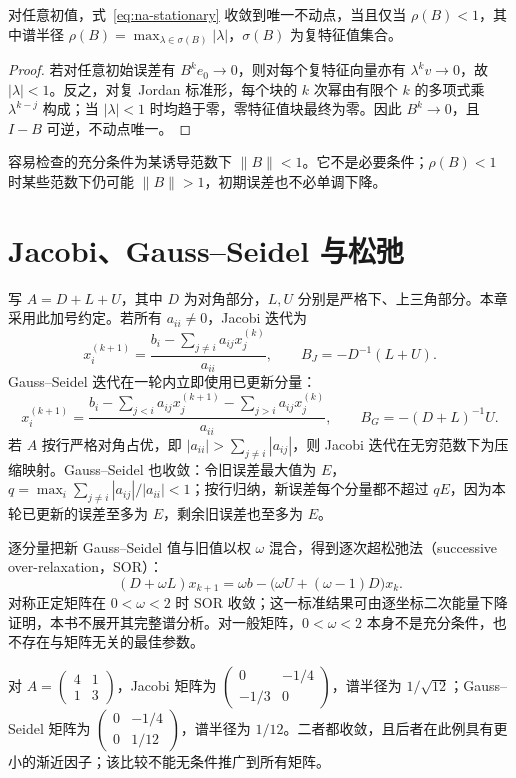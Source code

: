 \documentclass[UTF8,12pt,a4paper,fontset=fandol]{ctexbook}
\begin{document}
\begin{theorem}[定常迭代的充要条件]
对任意初值，式~\eqref{eq:na-stationary} 收敛到唯一不动点，当且仅当 $\rho(B)<1$，其中谱半径 $\rho(B)=\max_{\lambda\in\sigma(B)}|\lambda|$，$\sigma(B)$ 为复特征值集合。
\end{theorem}
\begin{proof}
若对任意初始误差有 $B^ke_0\to0$，则对每个复特征向量亦有 $\lambda^kv\to0$，故 $|\lambda|<1$。反之，对复 Jordan 标准形，每个块的 $k$ 次幂由有限个 $k$ 的多项式乘 $\lambda^{k-j}$ 构成；当 $|\lambda|<1$ 时均趋于零，零特征值块最终为零。因此 $B^k\to0$，且 $I-B$ 可逆，不动点唯一。
\end{proof}

容易检查的充分条件为某诱导范数下 $\|B\|<1$。它不是必要条件；$\rho(B)<1$ 时某些范数下仍可能 $\|B\|>1$，初期误差也不必单调下降。

\section{Jacobi、Gauss--Seidel 与松弛}
写 $A=D+L+U$，其中 $D$ 为对角部分，$L,U$ 分别是严格下、上三角部分。本章采用此加号约定。若所有 $a_{ii}\ne0$，Jacobi 迭代为
\[
 x_i^{(k+1)}=\frac{b_i-\sum_{j\ne i}a_{ij}x_j^{(k)}}{a_{ii}},
 \qquad B_J=-D^{-1}(L+U).
\]
Gauss--Seidel 迭代在一轮内立即使用已更新分量：
\[
 x_i^{(k+1)}=\frac{b_i-\sum_{j<i}a_{ij}x_j^{(k+1)}-\sum_{j>i}a_{ij}x_j^{(k)}}{a_{ii}},
 \qquad B_G=-(D+L)^{-1}U.
\]
若 $A$ 按行严格对角占优，即 $|a_{ii}|>\sum_{j\ne i}|a_{ij}|$，则 Jacobi 迭代在无穷范数下为压缩映射。Gauss--Seidel 也收敛：令旧误差最大值为 $E$，$q=\max_i\sum_{j\ne i}|a_{ij}|/|a_{ii}|<1$；按行归纳，新误差每个分量都不超过 $qE$，因为本轮已更新的误差至多为 $E$，剩余旧误差也至多为 $E$。

逐分量把新 Gauss--Seidel 值与旧值以权 $\omega$ 混合，得到逐次超松弛法（successive over-relaxation，SOR）：
\[
 (D+\omega L)x_{k+1}=\omega b-\bigl(\omega U+(\omega-1)D\bigr)x_k.
\]
对称正定矩阵在 $0<\omega<2$ 时 SOR 收敛；这一标准结果可由逐坐标二次能量下降证明，本书不展开其完整谱分析。对一般矩阵，$0<\omega<2$ 本身不是充分条件，也不存在与矩阵无关的最佳参数。

\begin{example}[一个可直接比较的系统]
对 $A=\begin{pmatrix}4&1\\1&3\end{pmatrix}$，Jacobi 矩阵为 $\begin{pmatrix}0&-1/4\\-1/3&0\end{pmatrix}$，谱半径为 $1/\sqrt{12}$；Gauss--Seidel 矩阵为 $\begin{pmatrix}0&-1/4\\0&1/12\end{pmatrix}$，谱半径为 $1/12$。二者都收敛，且后者在此例具有更小的渐近因子；该比较不能无条件推广到所有矩阵。
\end{example}
\end{document}
